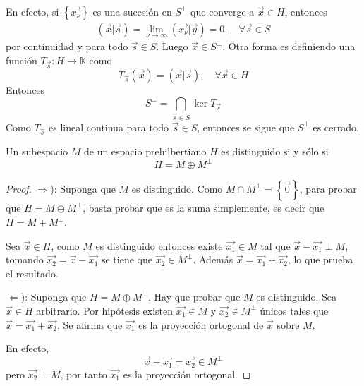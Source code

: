 \documentclass[12pt]{report}
\theoremstyle{largebreak}
\newcommand\cf[3]{\ensuremath{#1:#2\rightarrow#3}}
\newcommand\pint[2]{\ensuremath{\left(#1\big| #2\right)}}
\begin{document}
    \begin{sol}
        En efecto, si $\left\{\vec{x_\nu} \right\}$ es una sucesión en $S^\perp$ que converge a $\vec{x}\in H$, entonces
        \begin{equation*}
            \begin{split}
                \pint{\vec{x}}{\vec{s}}=\lim_{\nu\rightarrow\infty}\pint{\vec{x_\nu}}{\vec{y}}=0,\quad\forall\vec{s}\in S
            \end{split}
        \end{equation*}
        por continuidad y para todo $\vec{s}\in S$. Luego $\vec{x}\in S^\perp$. Otra forma es definiendo una función $\cf{T_{\vec{s}}}{H}{\mathbb{K}}$ como
        \begin{equation*}
            T_{\vec{s}}(\vec{x})=\pint{\vec{x}}{\vec{s}},\quad\forall\vec{x}\in H
        \end{equation*}
        Entonces
        \begin{equation*}
            S^\perp=\bigcap_{\vec{s}\in S}\ker T_{\vec{s}}
        \end{equation*}
        Como $T_{\vec{s}}$ es lineal continua para todo $\vec{s}\in S$, entonces se sigue que $S^\perp$ es cerrado.
    \end{sol}

    \begin{propo}
        Un subespacio $M$ de un espacio prehilbertiano $H$ es distinguido si y sólo si
        \begin{equation*}
            H=M\oplus M^\perp
        \end{equation*}
    \end{propo}

    \begin{proof}
        $\Rightarrow$): Suponga que $M$ es distinguido. Como $M\cap M^\perp=\left\{\vec{0} \right\}$, para probar que $H=M\oplus M^\perp$, basta probar que es la suma simplemente, es decir que $H=M+M^\perp$.
        
        Sea $\vec{x}\in H$, como $M$ es distinguido entonces existe $\vec{x_1}\in M$ tal que $\vec{x}-\vec{x_1}\perp M$, tomando $\vec{x_2}=\vec{x}-\vec{x_1}$ se tiene que $\vec{x_2}\in M^\perp$. Además $\vec{x}=\vec{x_1}+\vec{x_2}$, lo que prueba el resultado.

        $\Leftarrow$): Suponga que $H=M\oplus M^\perp$. Hay que probar que $M$ es distinguido. Sea $\vec{x}\in H$ arbitrario. Por hipótesis existen $\vec{x_1}\in M$ y $\vec{x_2}\in M^\perp$ únicos tales que $\vec{x}=\vec{x_1}+\vec{x_2}$. Se afirma que $\vec{x_1}$ es la proyección ortogonal de $\vec{x}$ sobre $M$. 
        
        En efecto,
        \begin{equation*}
            \vec{x}-\vec{x_1}=\vec{x_2}\in M^\perp
        \end{equation*}
        pero $\vec{x_2}\perp M$, por tanto $\vec{x_1}$ es la proyección ortogonal.
    \end{proof}
\end{document}

